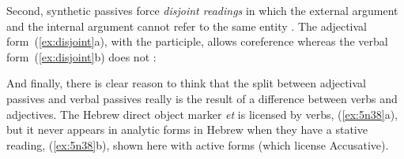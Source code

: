 \begin{exe}
\begin{xlist}
\begin{exe}
\begin{xlist}
\begin{exe}
\begin{exe}
\begin{xlist}
\begin{exe}
\begin{exe}
\begin{xlist}
\begin{exe}
\begin{xlist}
\begin{exe}
\begin{xlist}
\begin{exe}
\begin{xlist}
\begin{exe}
\begin{xlist}
\begin{xlist}
\begin{exe}
\begin{xlist}
\begin{exe}
\begin{xlist}
\begin{exe}
\begin{exe}
\begin{exe}
\begin{xlist}
\begin{exe}
\begin{exe}
\begin{xlist}
\begin{exe}
\begin{xlist}
\begin{exe}
\begin{xlist}
\begin{exe}
\begin{xlist}
\begin{xlist}
\begin{exe}
\begin{xlist}
\begin{exe}
\begin{xlist}
Second, synthetic passives force \textit{disjoint readings} in which the external argument and the internal argument cannot refer to the same entity \citep{bakeretal89}. The adjectival form~(\ref{ex:disjoint}a), with the participle, allows coreference whereas the verbal form~(\ref{ex:disjoint}b) does not \citep[720]{sichel09}:
 \begin{exe}
 \ex  \label{ex:disjoint} 
 \begin{xlist} 
        
        
 \z
\z 

And finally, there is clear reason to think that the split between adjectival passives and verbal passives really is the result of a difference between verbs and adjectives. The Hebrew direct object marker \emph{et} is licensed by verbs, (\ref{ex:5n38}a), but it never appears in analytic forms in Hebrew when they have a stative reading, (\ref{ex:5n38}b), shown here with active forms (which license Accusative). 
 \begin{exe}
 \ex  \label{ex:5n38}
 \begin{xlist} 
			

\end{xlist}
\end{exe}
\end{xlist}
\end{exe}
\end{xlist}
\end{exe}
\end{xlist}
\end{exe}
\end{xlist}
\end{xlist}
\end{exe}
\end{xlist}
\end{exe}
\end{xlist}
\end{exe}
\end{xlist}
\end{exe}
\end{exe}
\end{xlist}
\end{exe}
\end{exe}
\end{exe}
\end{xlist}
\end{exe}
\end{xlist}
\end{exe}
\end{xlist}
\end{xlist}
\end{exe}
\end{xlist}
\end{exe}
\end{xlist}
\end{exe}
\end{xlist}
\end{exe}
\end{xlist}
\end{exe}
\end{exe}
\end{xlist}
\end{exe}
\end{exe}
\end{xlist}
\end{exe}
\end{xlist}
\end{exe}
